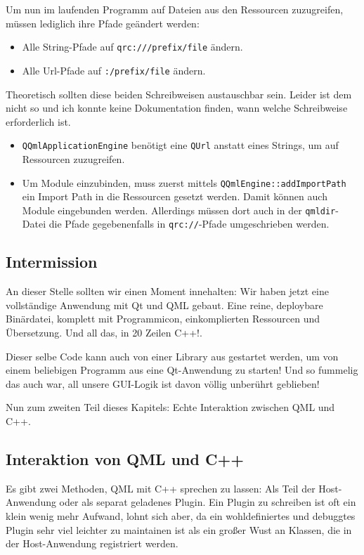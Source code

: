 \documentclass[a4paper]{article}
\begin{document}
Um nun im laufenden Programm auf Dateien aus den Ressourcen zuzugreifen, müssen lediglich ihre Pfade geändert werden:
\begin{itemize}
\item Alle String-Pfade auf \verb~qrc:///prefix/file~ ändern.
\item Alle Url-Pfade auf \verb~:/prefix/file~ ändern.
\end{itemize}

Theoretisch sollten diese beiden Schreibweisen austauschbar sein. Leider ist dem nicht so und ich konnte keine Dokumentation finden, wann welche Schreibweise erforderlich ist.
\begin{itemize}
\item \verb~QQmlApplicationEngine~ benötigt eine \verb~QUrl~ anstatt eines Strings, um auf Ressourcen zuzugreifen.
\item Um Module einzubinden, muss zuerst mittels \verb~QQmlEngine::addImportPath~ ein Import Path in die Ressourcen gesetzt werden. Damit können auch Module eingebunden werden. Allerdings müssen dort auch in der \verb~qmldir~-Datei die Pfade gegebenenfalls in \verb~qrc://~-Pfade umgeschrieben werden.
\end{itemize}
\subsection{Intermission}
\label{sec-2-7}
An dieser Stelle sollten wir einen Moment innehalten: Wir haben jetzt eine vollständige Anwendung mit Qt und QML gebaut. Eine reine, deploybare Binärdatei, komplett mit Programmicon, einkomplierten Ressourcen und Übersetzung. Und all das, in 20 Zeilen C++!.

Dieser selbe Code kann auch von einer Library aus gestartet werden, um von einem beliebigen Programm aus eine Qt-Anwendung zu starten! Und so fummelig das auch war, all unsere GUI-Logik ist davon völlig unberührt geblieben!

Nun zum zweiten Teil dieses Kapitels: Echte Interaktion zwischen QML und C++.
\subsection{Interaktion von QML und C++}
\label{sec-2-8}
Es gibt zwei Methoden, QML mit C++ sprechen zu lassen: Als Teil der Host-Anwendung oder als separat geladenes Plugin. Ein Plugin zu schreiben ist oft ein klein wenig mehr Aufwand, lohnt sich aber, da ein wohldefiniertes und debuggtes Plugin sehr viel leichter zu maintainen ist als ein großer Wust an Klassen, die in der Host-Anwendung registriert werden.
\end{document}
